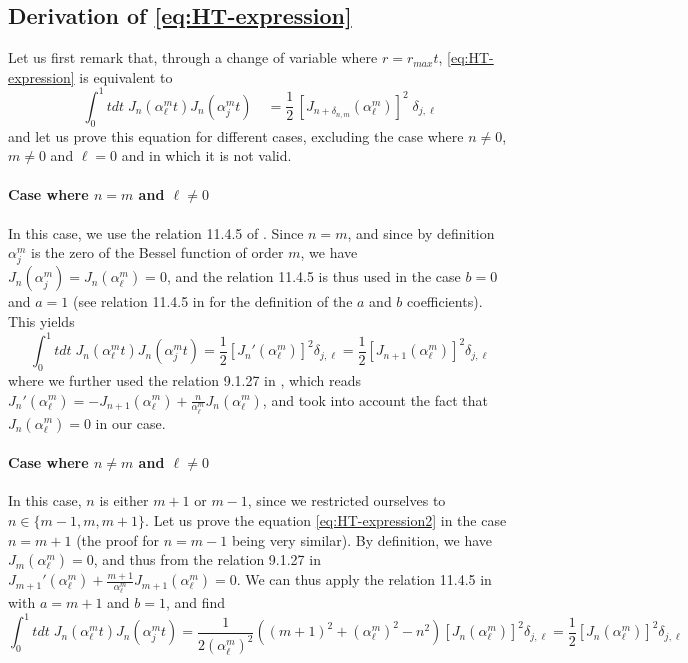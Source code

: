 \documentclass[1p,times]{elsarticle}
\begin{document}
\subsection{Derivation of \cref{eq:HT-expression}}
\label{sec:HT-expression}

Let us first remark that, through a change of variable where
$r=r_{max}t$, \cref{eq:HT-expression} is equivalent to
\begin{equation} 
\label{eq:HT-expression2}
\int_0^1 \!\!\! tdt\; J_n (\alpha^m_{\ell} t) J_n (\alpha^m_{j} t)
\quad = \frac{1}{2}\,[
J_{n+\delta_{n,m}}(\alpha_\ell^m)]^2\;\delta_{j,\ell} 
\end{equation}
\noindent and let us prove this equation for different cases,
excluding the case where $n\neq 0$, $m\neq 0$ and $\ell=0$ and in which it is
not valid.

\paragraph{Case where $n=m$ and $\ell \neq 0$} In this case, we use
the relation 11.4.5 of \cite{Abramowitz}. Since $n=m$, and since by
definition $\alpha^m_j$ is the zero of the Bessel function of order $m$, we have
$J_n(\alpha^m_j)= J_n(\alpha^m_\ell)=0$, and the relation 11.4.5 is
thus used in the case $b=0$ and $a=1$ (see relation 11.4.5 in \cite{Abramowitz} for the definition
of the $a$ and $b$ coefficients). This yields
\begin{equation} \int_0^1 \!\!\! tdt\; J_n (\alpha^m_{\ell} t) J_n (\alpha^m_{j} t)
= \frac{1}{2}[ J_n'(\alpha_\ell^m) ]^2 \delta_{j,\ell} = \frac{1}{2}[ J_{n+1}(\alpha_\ell^m) ]^2 \delta_{j,\ell}\end{equation}
\noindent where we further used the relation 9.1.27 in \cite{Abramowitz}, which
reads $ J_n'(\alpha^m_\ell) = -J_{n+1}(\alpha^m_\ell)+
\frac{n}{\alpha^m_\ell} J_{n}(\alpha^m_\ell)$, and took into account
the fact that $J_n (\alpha^m_\ell)=0$ in our case.

\paragraph{Case where $n \neq m$ and $\ell \neq 0$} In this case, $n$
is either $m+1$ or $m-1$, since we restricted ourselves to $n\in \{m-1,m,m+1\}$. Let us
prove the equation \cref{eq:HT-expression2} in the case $n=m+1$ (the
proof for $n=m-1$ being very similar). By
definition, we have $J_m(\alpha^m_\ell) = 0$, and thus from the relation 9.1.27 in
\cite{Abramowitz} $J_{m+1}'(\alpha^m_\ell) + \frac{m+1}{\alpha^m_\ell}
J_{m+1}(\alpha^m_\ell) = 0$. We can thus apply the relation 11.4.5 in
\cite{Abramowitz} with $a=m+1$ and $b=1$, and find 
\begin{equation} \int_0^1 \!\!\! tdt\; J_n (\alpha^m_{\ell} t) J_n (\alpha^m_{j} t) = \frac{1}{2
  (\alpha_\ell^m)^2}\left( (m+1)^2 + (\alpha_\ell^m)^2 - n^2 \right)[
J_{n}(\alpha_\ell^m) ]^2 \delta_{j,\ell} = \frac{1}{2}[J_{n}(\alpha_\ell^m) ]^2 \delta_{j,\ell}  \end{equation}
\end{document}
